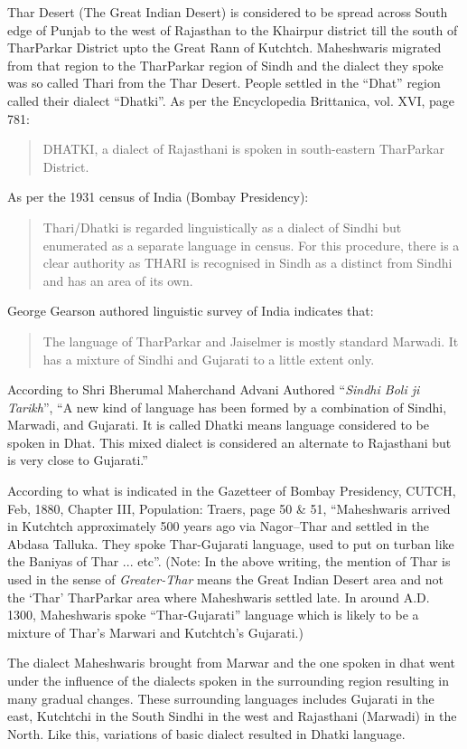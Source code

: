 Thar Desert (The Great Indian Desert) is considered to be spread across South
edge of Punjab to the west of Rajasthan to the Khairpur district till the south
of TharParkar District upto the Great Rann of Kutchtch. Maheshwaris migrated
from that region to the TharParkar region of Sindh and the dialect they spoke
was so called Thari from the Thar Desert. People settled in the ``Dhat'' region
called their dialect ``Dhatki''. As per the Encyclopedia Brittanica, vol. XVI,
page 781:
\begin{quote}
 DHATKI, a dialect of Rajasthani is spoken in south-eastern TharParkar District.
\end{quote}
As per the 1931 census of India (Bombay Presidency):
\begin{quote}
Thari/Dhatki is regarded linguistically as a dialect of Sindhi but enumerated as
a separate language in census. For this procedure, there is a clear authority as
THARI is recognised in Sindh as a distinct from Sindhi and has an area of its
own.
\end{quote}
George Gearson authored linguistic survey of India indicates that:
\begin{quote}
The language of TharParkar and Jaiselmer is mostly standard Marwadi. It has a
mixture of Sindhi and Gujarati to a little extent only.
\end{quote}
According to Shri Bherumal Maherchand Advani Authored ``\textit{Sindhi Boli ji
Tarikh}'', ``A new kind of language has been formed by a combination of Sindhi,
Marwadi, and Gujarati. It is called Dhatki means language considered to be
spoken in Dhat. This mixed dialect is considered an alternate to Rajasthani but
is very close to Gujarati.''

According to what is indicated in the Gazetteer of Bombay Presidency, CUTCH,
Feb, 1880, Chapter III, Population: Traers, page 50 \& 51, ``Maheshwaris arrived
in Kutchtch approximately 500 years ago via Nagor--Thar and settled in the
Abdasa Talluka. They spoke Thar-Gujarati language, used to put on turban like
the Baniyas of Thar ... etc''. (Note: In the above writing, the mention of Thar
is used in the sense of \textit{Greater-Thar} means the Great Indian Desert area
and not the `Thar' TharParkar area where Maheshwaris settled late. In around
A.D. 1300, Maheshwaris spoke ``Thar-Gujarati'' language which is likely to be a
mixture of Thar's Marwari and Kutchtch's Gujarati.)

The dialect Maheshwaris brought from Marwar and the one spoken in dhat went
under the influence of the dialects spoken in the surrounding region resulting
in many gradual changes. These surrounding languages includes Gujarati in the
east, Kutchtchi in the South Sindhi in the west and Rajasthani (Marwadi) in the
North. Like this, variations of basic dialect resulted in Dhatki language.

